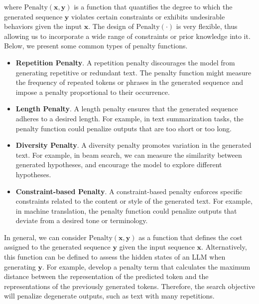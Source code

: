 \noindent where $\mathrm{Penalty}(\mathbf{x},\mathbf{y})$ is a function that quantifies the degree to which the generated sequence $\mathbf{y}$ violates certain constraints or exhibits undesirable behaviors given the input $\mathbf{x}$. The design of $\mathrm{Penalty}(\cdot)$ is very flexible, thus allowing us to incorporate a wide range of constraints or prior knowledge into it. Below, we present some common types of penalty functions.

\begin{itemize}
\item \vspace{0.5em} \textbf{Repetition Penalty}. A repetition penalty discourages the model from generating repetitive or redundant text. The penalty function might measure the frequency of repeated tokens or phrases in the generated sequence and impose a penalty proportional to their occurrence.
\item \vspace{0.3em} \textbf{Length Penalty}. A length penalty ensures that the generated sequence adheres to a desired length. For example, in text summarization tasks, the penalty function could penalize outputs that are too short or too long.
\item \vspace{0.3em} \textbf{Diversity Penalty}. A diversity penalty promotes variation in the generated text. For example, in beam search, we can measure the similarity between generated hypotheses, and encourage the model to explore different hypotheses.
\item \vspace{0.3em} \textbf{Constraint-based Penalty}. A constraint-based penalty enforces specific constraints related to the content or style of the generated text. For example, in machine translation, the penalty function could penalize outputs that deviate from a desired tone or terminology.
\end{itemize}
\vspace{0.5em}

In general, we can consider $\mathrm{Penalty}(\mathbf{x},\mathbf{y})$ as a function that defines the cost assigned to the generated sequence $\mathbf{y}$ given the input sequence $\mathbf{x}$. Alternatively, this function can be defined to assess the hidden states of an LLM when generating $\mathbf{y}$. For example, \citet{su-etal:2022contrastive} develop a penalty term that calculates the maximum distance between the representation of the predicted token and the representations of the previously generated tokens. Therefore, the search objective will penalize degenerate outputs, such as text with many repetitions.

